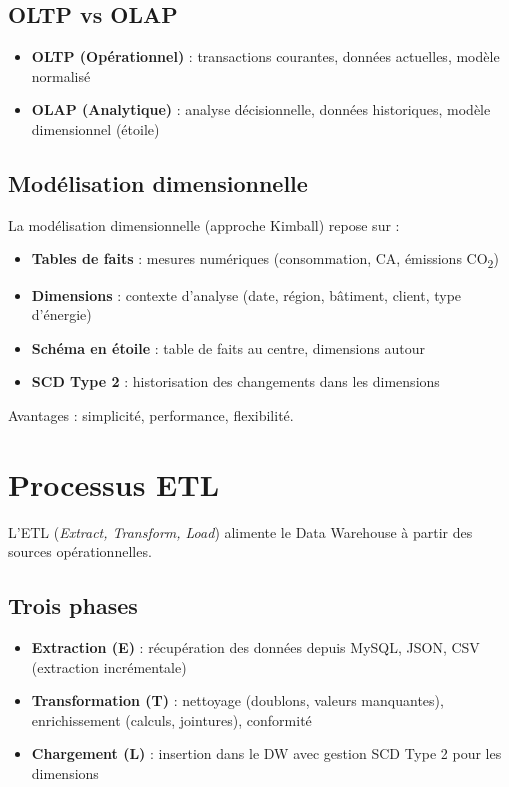 \documentclass[12pt,a4paper]{report}
\begin{document}
\subsection{OLTP vs OLAP}

\begin{itemize}
    \item \textbf{OLTP (Opérationnel)} : transactions courantes, données actuelles, modèle normalisé
    \item \textbf{OLAP (Analytique)} : analyse décisionnelle, données historiques, modèle dimensionnel (étoile)
\end{itemize}

\subsection{Modélisation dimensionnelle}

La modélisation dimensionnelle (approche Kimball) repose sur :

\begin{itemize}
    \item \textbf{Tables de faits} : mesures numériques (consommation, CA, émissions CO\textsubscript{2})
    \item \textbf{Dimensions} : contexte d'analyse (date, région, bâtiment, client, type d'énergie)
    \item \textbf{Schéma en étoile} : table de faits au centre, dimensions autour
    \item \textbf{SCD Type 2} : historisation des changements dans les dimensions
\end{itemize}

Avantages : simplicité, performance, flexibilité.

\section{Processus ETL}

L'ETL (\textit{Extract, Transform, Load}) alimente le Data Warehouse à partir des sources opérationnelles.

\subsection{Trois phases}

\begin{itemize}
    \item \textbf{Extraction (E)} : récupération des données depuis MySQL, JSON, CSV (extraction incrémentale)
    \item \textbf{Transformation (T)} : nettoyage (doublons, valeurs manquantes), enrichissement (calculs, jointures), conformité
    \item \textbf{Chargement (L)} : insertion dans le DW avec gestion SCD Type 2 pour les dimensions
\end{itemize}
\end{document}
